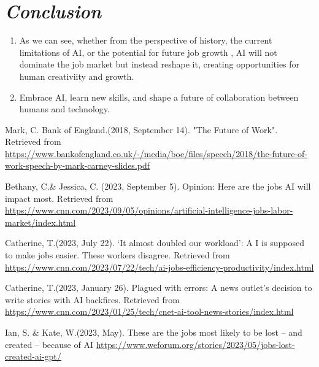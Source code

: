 \documentclass{article}
\begin{document}
\section{\textit{Conclusion}}
\begin{enumerate}
      \renewcommand{\labelenumi}{\Roman{enumi}.}
      \item As we can see, whether from the perspective of history,
       the current limitations of AI, or the potential for future
      job growth , AI will not dominate the job market but instead 
      reshape it, creating opportunities for human creativiity and growth.
      \item Embrace AI, learn new skills, and shape a future of 
      collaboration between humans and technology.
\end{enumerate}

\begin{thebibliography}{}

Mark, C. Bank of England.(2018, September 14). "The Future of Work".
Retrieved from \url{https://www.bankofengland.co.uk/-/media/boe/files/speech/2018/the-future-of-work-speech-by-mark-carney-slides.pdf}

Bethany, C.\& Jessica, C. (2023, September 5). Opinion: Here are the jobs AI will impact most. 
Retrieved from \url{https://www.cnn.com/2023/09/05/opinions/artificial-intelligence-jobs-labor-market/index.html}

Catherine, T.(2023, July 22). ‘It almost doubled our workload’: A
I is supposed to make jobs easier. These workers disagree. 
Retrieved from \url{https://www.cnn.com/2023/07/22/tech/ai-jobs-efficiency-productivity/index.html}

Catherine, T.(2023, January 26). Plagued with errors: 
A news outlet’s decision to write stories with AI backfires. 
Retrieved from \url{https://www.cnn.com/2023/01/25/tech/cnet-ai-tool-news-stories/index.html}

Ian, S. \& Kate, W.(2023, May). These are the jobs most likely to be lost – and created – because of AI 
\url{https://www.weforum.org/stories/2023/05/jobs-lost-created-ai-gpt/}

\end{thebibliography}
\end{document}
